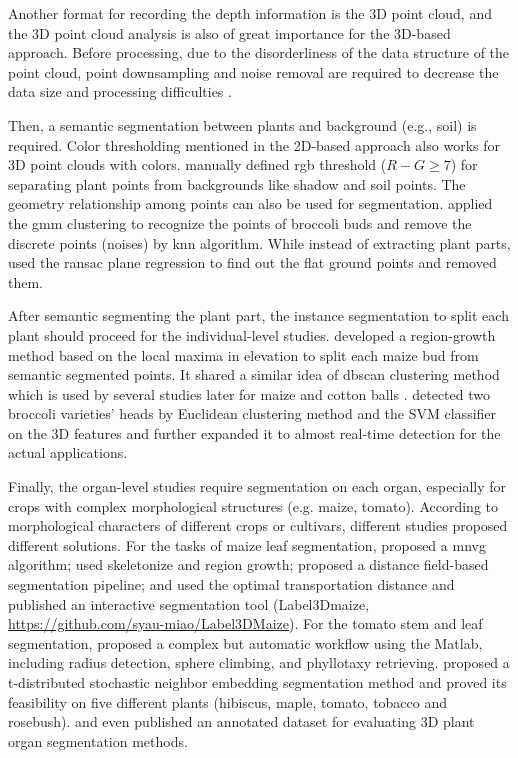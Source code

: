 Another format for recording the depth information is the 3D point cloud, and the 3D point cloud analysis is also of great importance for the 3D-based approach. Before processing, due to the disorderliness of the data structure of the point cloud, point downsampling and noise removal are required to decrease the data size and processing difficulties \citep{ma_calculation_2019}. 

Then, a semantic segmentation between plants and background (e.g., soil) is required. Color thresholding mentioned in the 2D-based approach also works for 3D point clouds with colors. \citet[Fig.~3]{xiao_image-based_2020} manually defined \gls{rgb} threshold ($R-G\geq7$) for separating plant points from backgrounds like shadow and soil points. The geometry relationship among points can also be used for segmentation. \citet{ge_method_2019} applied the \gls{gmm} clustering to recognize the points of broccoli buds and remove the discrete points (noises) by \gls{knn} algorithm. While instead of extracting plant parts, \citet{garrido_3d_2015} used the \gls{ransac} plane regression to find out the flat ground points and removed them.

After semantic segmenting the plant part, the instance segmentation to split each plant should proceed for the individual-level studies. \citet{hofle_radiometric_2014} developed a region-growth method based on the local maxima in elevation to split each maize bud from semantic segmented points. It shared a similar idea of \gls{dbscan} clustering method which is used by several studies later for maize \citep{lin_segmentation_2022} and cotton balls \citep{sun_3d_2020}. \citet{kusumam_3d_2017} detected two broccoli varieties' heads by Euclidean clustering method and the SVM classifier on the 3D features and \citet{montes_real-time_2020} further expanded it to almost real-time detection for the actual applications.

Finally, the organ-level studies require segmentation on each organ, especially for crops with complex morphological structures (e.g. maize, tomato). According to morphological characters of different crops or cultivars, different studies proposed different solutions. For the tasks of maize leaf segmentation, \citet{jin_stemleaf_2019} proposed a \gls{mnvg} algorithm; \citet{liu_canopy_2021} used skeletonize and region growth; \citet{wang_dfsp_2023} proposed a distance field-based segmentation pipeline; and \citet{miao_label3dmaize_2021} used the optimal transportation distance and published an interactive segmentation tool (Label3Dmaize, \url{https://github.com/syau-miao/Label3DMaize}). For the tomato stem and leaf segmentation, \citet{rossi_implementation_2022} proposed a complex but automatic workflow using the Matlab, including radius detection, sphere climbing, and phyllotaxy retrieving. \citet{helin_using_2023} proposed a t-distributed stochastic neighbor embedding segmentation method and proved its feasibility on five different plants (hibiscus, maple, tomato, tobacco and rosebush). \citet{dutagaci_rose-x_2020} and \citet{schunck_pheno4d_2021} even published an annotated dataset for evaluating 3D plant organ segmentation methods.



